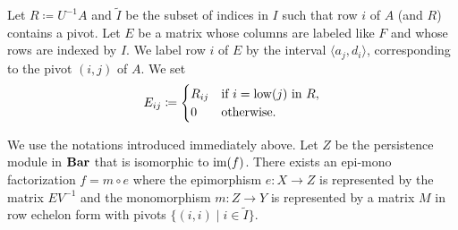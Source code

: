 Let $R \coloneq U^{-1} A$ and $\tilde{I}$ be the subset of indices in $I$ such that row $i$ of $A$ (and $R$) contains a pivot.
Let $E$ be a matrix whose columns are labeled like $F$ and whose rows are indexed by $I$. We label row $i$ of $E$ by the interval $\langle a_j, d_i \rangle$, corresponding to the pivot $(i, j)$ of $A$. We set
\[
  E_{ij} \coloneq \begin{cases}
    R_{ij} & \text{if } i = \low(j) \text{ in } R, \\
    0 & \text{otherwise}.
  \end{cases}
\]

\begin{proposition}
  We use the notations introduced immediately above. Let $Z$ be the persistence module in $\Bar$ that is isomorphic to $\im(f)$.
  There exists an epi-mono factorization $f = m \circ e$ where the epimorphism $e \colon X \to Z$ is represented by the matrix $E V^{-1}$ and the monomorphism $m \colon Z \to Y$ is represented by a matrix $M$ in row echelon form with pivots $\{(i, i) \mid i \in \tilde{I}\}$.
\end{proposition}

